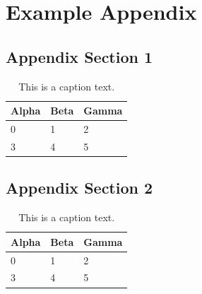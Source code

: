%
\chapter{Example Appendix}
\label{sec:appendix}

\Blindtext[1][1]

\section{Appendix Section 1}
\label{sec:appendix:sec1}

\Blindtext[1][1]

\begin{table}[h]
    \caption{This is a caption text.}
	\begin{tabularx}{\textwidth}{X | X | X}
		Alpha		& Beta			& Gamma			\\ \hline
		0			& 1				& 2				\\ \hline
		3			& 4				& 5				\\ %
	\end{tabularx}
	\label{tab:table1}
\end{table}

\section{Appendix Section 2}
\label{sec:appendix:sec2}

\Blindtext[1][1]

\begin{table}[h]
    \caption{This is a caption text.}
	\begin{tabularx}{\textwidth}{X | X | X}
		Alpha		& Beta			& Gamma			\\ \hline
		0			& 1				& 2				\\ \hline
		3			& 4				& 5				\\ %
	\end{tabularx}

	\label{tab:table2}
\end{table}

\Blindtext[1][2]
